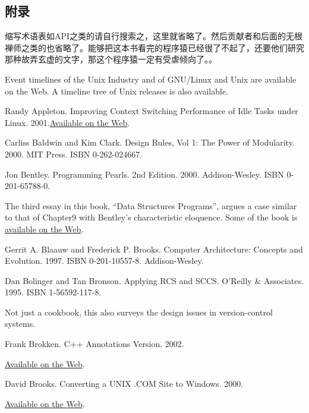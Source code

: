 \documentclass[12pt,oneside]{book}
\begin{document}
\begin{common-format}
\chapter{附录}
缩写术语表如API之类的请自行搜索之，这里就省略了。然后贡献者和后面的无根禅师之类的也省略了。能够把这本书看完的程序猿已经很了不起了，还要他们研究那种故弄玄虚的文字，那这个程序猿一定有受虐倾向了。。

\backmatter
{}

Event timelines of the Unix Industry and of GNU/Linux and Unix are available on the Web. A timeline tree of Unix releases is also available.

\begin{thebibliography}{9}
 Randy Appleton. Improving Context Switching Performance of Idle Tasks under Linux. 2001.\href{http://euclid.nmu.edu/~randy/Research/Papers/Scheduler/}{Available on the Web}.

 Carliss Baldwin and Kim Clark. Design Rules, Vol 1: The Power of Modularity. 2000. MIT Press. ISBN 0-262-024667.

 Jon Bentley. Programming Pearls. 2nd Edition. 2000. Addison-Wesley. ISBN 0-201-65788-0.

The third essay in this book, “Data Structures Programs”, argues a case similar to that of Chapter9 with Bentley's characteristic eloquence. Some of the book is \href{http://www.cs.bell-labs.com/cm/cs/pearls/}{available on the Web}.

 Gerrit A. Blaauw and Frederick P. Brooks. Computer Architecture: Concepts and Evolution. 1997. ISBN 0-201-10557-8. Addison-Wesley.

 Dan Bolinger and Tan Bronson. Applying RCS and SCCS. O'Reilly \&{} Associates. 1995. ISBN 1-56592-117-8.

Not just a cookbook, this also surveys the design issues in version-control systems.

 Frank Brokken. C++ Annotations Version. 2002.

\href{http://www.icce.rug.nl/documents/cplusplus/cplusplus.html}{Available on the Web}.

 David Brooks. Converting a UNIX .COM Site to Windows. 2000.

\href{http://www.securityoffice.net/mssecrets/hotmail.html#_Toc491601819}{Available on the Web}.


\end{thebibliography}
\end{common-format}
\end{document}
